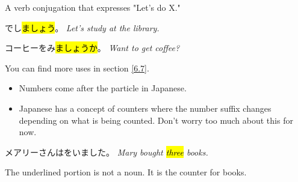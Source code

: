     {
    A verb conjugation that expresses "Let's do X."

   でし\hl{ましょう}。 
   \textit{Let's study at the library.}

    コーヒーをみ\hl{ましょうか}。
    \textit{Want to get coffee?}
    
    You can find more uses in section \ref{6.7}.
    }

    {
    \begin{itemize}
        \item Numbers come after the particle in Japanese.
        \item Japanese has a concept of counters where the number suffix changes depending on what is being counted. Don't worry too much about this for now. 
    \end{itemize}

    メアリーさんはをいました。
    \textit{Mary bought \hl{three} books.}

    The underlined portion is not a noun. It is the counter for books.
    }